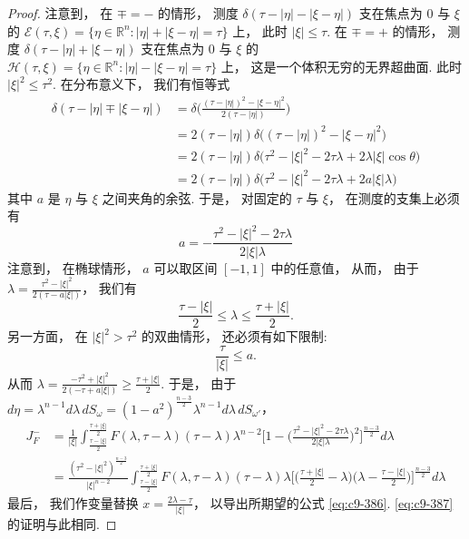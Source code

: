 \begin{proof}
注意到， 在 $\mp = -$ 的情形， 测度 $\delta(\tau - |\eta| - |\xi-\eta|)$ 支在焦点为 $0$ 与 $\xi$ 的 $\mathcal{E}(\tau, \xi) = \{\eta\in\mathbb{R}^n: |\eta| + |\xi-\eta| = \tau\}$ 上， 此时 $|\xi| \leq \tau$. 在 $\mp = +$ 的情形， 测度 $\delta(\tau - |\eta| + |\xi-\eta|)$ 支在焦点为 $0$ 与 $\xi$ 的 $\mathcal{H}(\tau, \xi) = \{\eta\in\mathbb{R}^n: |\eta| - |\xi-\eta| = \tau\}$ 上， 这是一个体积无穷的无界超曲面. 此时 $|\xi|^2 \leq \tau^2$. 在分布意义下， 我们有恒等式
\[
\begin{aligned}
\delta(\tau - |\eta| \mp |\xi-\eta|) &= \delta\big(\frac{(\tau - |\eta|)^2 - |\xi-\eta|^2}{2(\tau - |\eta|)}\big)\\
&= 2(\tau - |\eta|)\delta\big((\tau - |\eta|)^2 - |\xi-\eta|^2\big)\\
&= 2(\tau - |\eta|)\delta\big(\tau^2 - |\xi|^2 - 2\tau\lambda + 2\lambda|\xi|\cos\theta\big)\\
&= 2(\tau - |\eta|)\delta\big(\tau^2 - |\xi|^2 - 2\tau\lambda + 2a|\xi|\lambda\big)
\end{aligned}
\]
其中 $a$ 是 $\eta$ 与 $\xi$ 之间夹角的余弦. 于是， 对固定的 $\tau$ 与 $\xi$， 在测度的支集上必须有
\begin{equation}
a = -\frac{\tau^2 - |\xi|^2 - 2\tau\lambda}{2|\xi|\lambda}\label{eq:c9-388}
\end{equation}
注意到， 在椭球情形， $a$ 可以取区间 $[-1, 1]$ 中的任意值， 从而， 由于 $\lambda = \frac{\tau^2 - |\xi|^2}{2(\tau - a|\xi|)}$， 我们有
\[
\frac{\tau - |\xi|}{2} \leq \lambda \leq \frac{\tau + |\xi|}{2}.
\]
另一方面， 在 $|\xi|^2 > \tau^2$ 的双曲情形， 还必须有如下限制:
\[
\frac{\tau}{|\xi|} \leq a.
\]
从而 $\lambda = \frac{-\tau^2 + |\xi|^2}{2(-\tau + a|\xi|)} \geq \frac{\tau + |\xi|}{2}$.
于是， 由于 $d\eta = \lambda^{n-1}d\lambda\, dS_\omega = (1 - a^2)^{\frac{n-3}{2}}\lambda^{n-1}d\lambda\, dS_{\omega'}$，
\[
\begin{aligned}
J_F^{-} &= \frac{1}{|\xi|}\int_{\frac{\tau-|\xi|}{2}}^{\frac{\tau+|\xi|}{2}}F(\lambda, \tau-\lambda)(\tau-\lambda)\lambda^{n-2}\Big[1 - \Big(\frac{\tau^2 - |\xi|^2 - 2\tau\lambda}{2|\xi|\lambda}\Big)^2\Big]^{\frac{n-3}{2}}d\lambda\\
&= \frac{(\tau^2 - |\xi|^2)^{\frac{n-3}{2}}}{|\xi|^{n-2}}\int_{\frac{\tau-|\xi|}{2}}^{\frac{\tau+|\xi|}{2}}F(\lambda, \tau-\lambda)(\tau-\lambda)\lambda\Big[\Big(\frac{\tau+|\xi|}{2} - \lambda\Big)\Big(\lambda - \frac{\tau-|\xi|}{2}\Big)\Big]^{\frac{n-3}{2}}d\lambda
\end{aligned}
\]
最后， 我们作变量替换 $x = \frac{2\lambda - \tau}{|\xi|}$， 以导出所期望的公式 \eqref{eq:c9-386}. \eqref{eq:c9-387} 的证明与此相同.
\end{proof}

